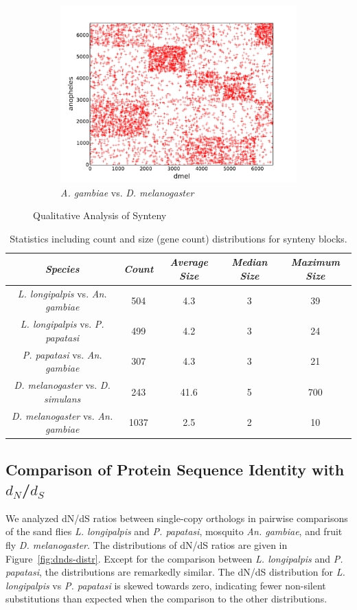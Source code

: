 \begin{figure}[H]
\begin{subfigure}[b]{0.45\textwidth}
    \includegraphics[width=\textwidth]{figures/synteny/dmel_anopheles_plot}
    \caption{\emph{A. gambiae} vs. \emph{D. melanogaster}}
    \label{fig:synteny-dotplots-anopheles-drosophila}
  \end{subfigure}
\label{fig:dot-plots}
\caption{Qualitative Analysis of Synteny}
\end{figure}

\begin{table}[H]
  \centering
  \begin{tabular}{c c c c c} \hline
    \emph{Species} & \emph{Count} & \emph{Average Size} & \emph{Median Size} & \emph{Maximum Size} \\ \hline
    \emph{L. longipalpis} vs. \emph{An. gambiae} & 504 & 4.3 & 3 & 39 \\
    \emph{L. longipalpis} vs. \emph{P. papatasi} & 499 & 4.2 & 3 & 24 \\
    \emph{P. papatasi} vs. \emph{An. gambiae} & 307 & 4.3 & 3 & 21 \\
    \emph{D. melanogaster} vs. \emph{D. simulans} & 243 & 41.6 & 5 & 700 \\
    \emph{D. melanogaster} vs. \emph{An. gambiae} & 1037 & 2.5 & 2 & 10
  \end{tabular}
  \caption{Statistics including count and size (gene count) distributions for synteny blocks.}
  \label{tab:synteny-block-stats}
\end{table}

\subsection{Comparison of Protein Sequence Identity with $d_N$/$d_S$}
We analyzed dN/dS ratios between single-copy orthologs in pairwise comparisons of the sand flies \emph{L. longipalpis} and \emph{P. papatasi}, mosquito \emph{An. gambiae}, and fruit fly \emph{D. melanogaster}.  The distributions of dN/dS ratios are given in Figure~\ref{fig:dnds-distr}.  Except for the comparison between \emph{L. longipalpis} and \emph{P. papatasi}, the distributions are remarkedly similar.  The dN/dS distribution for \emph{L. longipalpis} vs \emph{P. papatasi} is skewed towards zero, indicating fewer non-silent substitutions than expected when the comparison to the other distributions.

